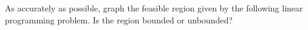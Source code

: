 \documentclass[11pt,letterpaper]{article}
\begin{document}

 As accurately as possible, graph the feasible region given by the following linear programming problem. Is the region bounded or unbounded? 
\end{document}
